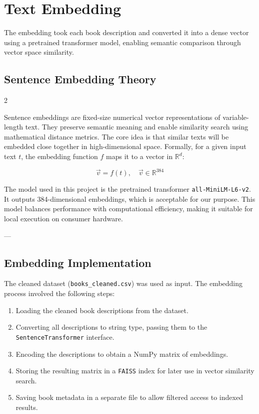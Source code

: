 \chapter{Text Embedding}
\label{chapter:embedding}

The embedding took each book description and converted it into a dense vector using a pretrained transformer model, enabling semantic comparison through vector space similarity.

\section{Sentence Embedding Theory}
\label{sec:embedding-theory}    2

Sentence embeddings are fixed-size numerical vector representations of variable-length text. 
They preserve semantic meaning and enable similarity search using mathematical distance metrics. 
The core idea is that similar texts will be embedded close together in high-dimensional space.
Formally, for a given input text $t$, the embedding function $f$ maps it to a vector in $\mathbb{R}^d$:

\[
\vec{v} = f(t), \quad \vec{v} \in \mathbb{R}^{384}
\]

The model used in this project is the pretrained transformer \texttt{all-MiniLM-L6-v2}\cite{sentence-transformers}.
It outputs 384-dimensional embeddings, which is acceptable for our purpose. 
This model balances performance with computational efficiency, making it suitable for local execution on consumer hardware.

---

\section{Embedding Implementation}
\label{sec:embedding-implementation}

The cleaned dataset (\texttt{books\_cleaned.csv}) was used as input. The embedding process involved the following steps:

\begin{enumerate}
    \item Loading the cleaned book descriptions from the dataset.
    \item Converting all descriptions to string type, passing them to the \texttt{SentenceTransformer} interface.
    \item Encoding the descriptions to obtain a NumPy matrix of embeddings.
    \item Storing the resulting matrix in a \texttt{FAISS} index for later use in vector similarity search.
    \item Saving book metadata in a separate file to allow filtered access to indexed results.
\end{enumerate}

